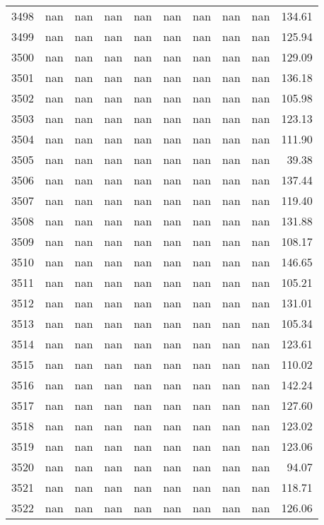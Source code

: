 \begin{tabular}{lrrrrrrrrr}
3498 & nan & nan & nan & nan & nan & nan & nan & nan & 134.61 \\
3499 & nan & nan & nan & nan & nan & nan & nan & nan & 125.94 \\
3500 & nan & nan & nan & nan & nan & nan & nan & nan & 129.09 \\
3501 & nan & nan & nan & nan & nan & nan & nan & nan & 136.18 \\
3502 & nan & nan & nan & nan & nan & nan & nan & nan & 105.98 \\
3503 & nan & nan & nan & nan & nan & nan & nan & nan & 123.13 \\
3504 & nan & nan & nan & nan & nan & nan & nan & nan & 111.90 \\
3505 & nan & nan & nan & nan & nan & nan & nan & nan & 39.38 \\
3506 & nan & nan & nan & nan & nan & nan & nan & nan & 137.44 \\
3507 & nan & nan & nan & nan & nan & nan & nan & nan & 119.40 \\
3508 & nan & nan & nan & nan & nan & nan & nan & nan & 131.88 \\
3509 & nan & nan & nan & nan & nan & nan & nan & nan & 108.17 \\
3510 & nan & nan & nan & nan & nan & nan & nan & nan & 146.65 \\
3511 & nan & nan & nan & nan & nan & nan & nan & nan & 105.21 \\
3512 & nan & nan & nan & nan & nan & nan & nan & nan & 131.01 \\
3513 & nan & nan & nan & nan & nan & nan & nan & nan & 105.34 \\
3514 & nan & nan & nan & nan & nan & nan & nan & nan & 123.61 \\
3515 & nan & nan & nan & nan & nan & nan & nan & nan & 110.02 \\
3516 & nan & nan & nan & nan & nan & nan & nan & nan & 142.24 \\
3517 & nan & nan & nan & nan & nan & nan & nan & nan & 127.60 \\
3518 & nan & nan & nan & nan & nan & nan & nan & nan & 123.02 \\
3519 & nan & nan & nan & nan & nan & nan & nan & nan & 123.06 \\
3520 & nan & nan & nan & nan & nan & nan & nan & nan & 94.07 \\
3521 & nan & nan & nan & nan & nan & nan & nan & nan & 118.71 \\
3522 & nan & nan & nan & nan & nan & nan & nan & nan & 126.06 \\

\end{tabular}

